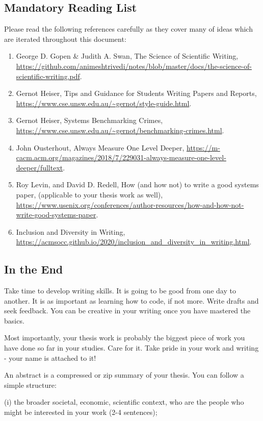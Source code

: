 \documentclass[11pt]{article}
\begin{document}
\subsection*{Mandatory Reading List}
Please read the following references carefully as they cover many of ideas which are iterated throughout this document:  
\begin{enumerate}
    \item George D. Gopen \& Judith A. Swan, The Science of Scientific Writing, \url{https://github.com/animeshtrivedi/notes/blob/master/docs/the-science-of-scientific-writing.pdf}. 
    \item Gernot Heiser, Tips and Guidance for Students Writing Papers and Reports, \url{https://www.cse.unsw.edu.au/~gernot/style-guide.html}. 
    \item Gernot Heiser, Systems Benchmarking Crimes, \url{https://www.cse.unsw.edu.au/~gernot/benchmarking-crimes.html}. 
    \item John Ousterhout, Always Measure One Level Deeper, \url{https://m-cacm.acm.org/magazines/2018/7/229031-always-measure-one-level-deeper/fulltext}. 
    \item Roy Levin, and David D. Redell,  How (and how not) to write a good systems paper, (applicable to your thesis work as well), \url{https://www.usenix.org/conferences/author-resources/how-and-how-not-write-good-systems-paper}.
    \item Inclusion and Diversity in Writing, \url{https://acmsocc.github.io/2020/inclusion_and_diversity_in_writing.html}. 
\end{enumerate}
\subsection*{In the End}
Take time to develop writing skills. It is going to be good from one day to another. It is as important as learning how to code, if not more. Write drafts and seek feedback. You can be creative in your writing once you have mastered the basics. 

Most importantly, your thesis work is probably the biggest piece of work you have done so far in your studies. Care for it. Take pride in your work and writing - your name is attached to it! 

\newpage
{}
An abstract is a compressed or zip summary of your thesis. You can follow a simple structure:

\noindent (i) the broader societal, economic, scientific context, who are the people who might be interested in your work (2-4 sentences);
\end{document}
